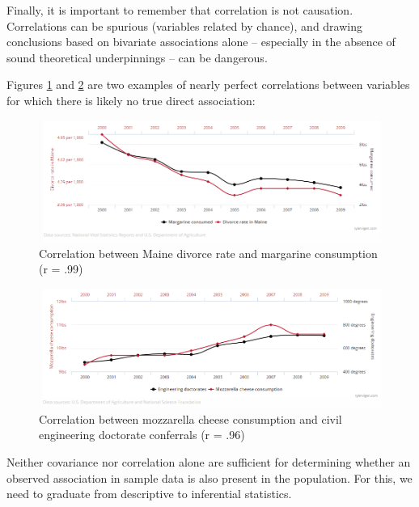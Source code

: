 \documentclass[
]{book}
\begin{document}
Finally, it is important to remember that correlation is not causation. Correlations can be spurious (variables related by chance), and drawing conclusions based on bivariate associations alone -- especially in the absence of sound theoretical underpinnings -- can be dangerous.

Figures \ref{fig:spur-corr-1} and \ref{fig:spur-corr-2} are two examples of nearly perfect correlations between variables for which there is likely no true direct association:

\begin{figure}

{\centering \includegraphics[width=1\linewidth]{graphics/spurious_corr_maine_divorce} 

}

\caption{Correlation between Maine divorce rate and margarine consumption (r = .99)}\label{fig:spur-corr-1}
\end{figure}

\begin{figure}

{\centering \includegraphics[width=1\linewidth]{graphics/spurious_corr_mozzarella_cheese} 

}

\caption{Correlation between mozzarella cheese consumption and civil engineering doctorate conferrals (r = .96)}\label{fig:spur-corr-2}
\end{figure}

Neither covariance nor correlation alone are sufficient for determining whether an observed association in sample data is also present in the population. For this, we need to graduate from descriptive to inferential statistics.
\end{document}
